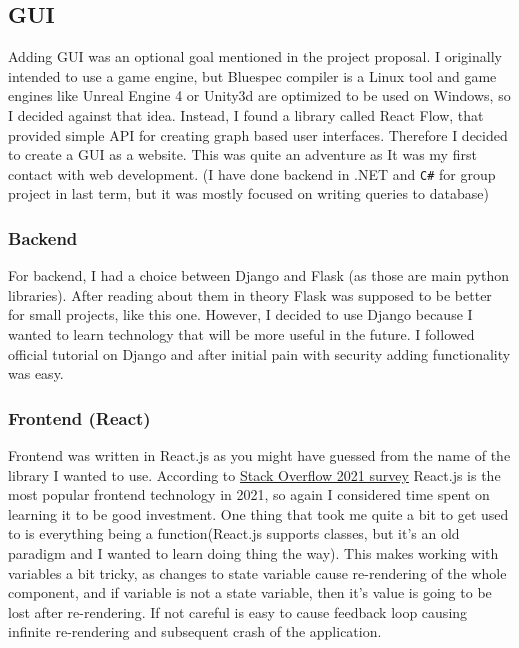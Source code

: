 \documentclass[14pt]{report}
\begin{document}
\subsection{GUI}
Adding GUI was an optional goal mentioned in the project proposal. I originally intended to use a game engine, but Bluespec compiler is a Linux tool and game engines like Unreal Engine 4 or Unity3d are optimized to be used on Windows, so I decided against that idea. Instead, I found a library called React Flow, that provided simple API for creating graph based user interfaces. Therefore I decided to create a GUI as a website. This was quite an adventure as It was my first contact with web development. (I have done backend in .NET and \verb!C#! for group project in last term, but it was mostly focused on writing queries to database)


\subsubsection{Backend}
For backend, I had a choice between Django and Flask (as those are main python libraries). After reading about them in theory Flask was supposed to be better for small projects, like this one. However, I decided to use Django because I wanted to learn technology that will be more useful in the future. I followed official tutorial on Django and after initial pain with security adding functionality was easy.

\subsubsection{Frontend (React)}
Frontend was written in React.js as you might have guessed from the name of the library I wanted to use. According to \href{https://insights.stackoverflow.com/survey/2021#most-popular-technologies-webframe}{Stack Overflow 2021 survey} React.js is the most popular frontend technology in 2021, so again I considered time spent on learning it to be good investment. One thing that took me quite a bit to get used to is everything being a function(React.js supports classes, but it's an old paradigm and I wanted to learn doing thing the  way). This makes working with variables a bit tricky, as changes to state variable cause re-rendering of the whole component, and if variable is not a state variable, then it's value is going to be lost after re-rendering. If not careful is easy to cause feedback loop causing infinite re-rendering and subsequent crash of the application. 
\end{document}
